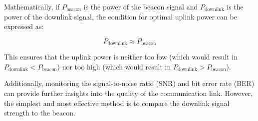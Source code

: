 Mathematically, if \( P_{\text{beacon}} \) is the power of the beacon signal and \( P_{\text{downlink}} \) is the power of the downlink signal, the condition for optimal uplink power can be expressed as:

\[ P_{\text{downlink}} \approx P_{\text{beacon}} \]

This ensures that the uplink power is neither too low (which would result in \( P_{\text{downlink}} < P_{\text{beacon}} \)) nor too high (which would result in \( P_{\text{downlink}} > P_{\text{beacon}} \)). 

Additionally, monitoring the signal-to-noise ratio (SNR) and bit error rate (BER) can provide further insights into the quality of the communication link. However, the simplest and most effective method is to compare the downlink signal strength to the beacon.

